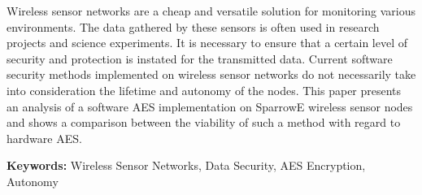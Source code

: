 Wireless sensor networks are a cheap and versatile solution for monitoring various environments.
The data gathered by these sensors is often used in research projects and science experiments.
It is necessary to ensure that a certain level of security and protection is instated for the transmitted 
data. Current software security methods implemented on wireless sensor networks do not necessarily take 
into consideration the lifetime and autonomy of the nodes. This paper presents an analysis of a software 
AES implementation on SparrowE wireless sensor nodes and shows a comparison between the viability of such a 
method with regard to hardware AES.

\textbf{Keywords:} Wireless Sensor Networks, Data Security, AES Encryption, Autonomy
